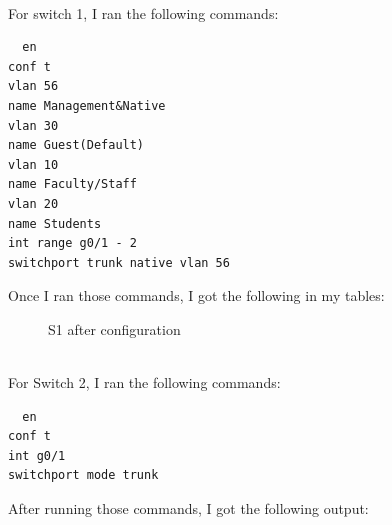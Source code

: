 \documentclass[../EngineeringJournal_CDavis.tex]{subfiles}
\begin{document}

\\
For switch 1, I ran the following commands:

\begin{verbatim}
  en
conf t
vlan 56
name Management&Native
vlan 30
name Guest(Default)
vlan 10
name Faculty/Staff
vlan 20
name Students
int range g0/1 - 2
switchport trunk native vlan 56
\end{verbatim}

Once I ran those commands, I got the following in my tables:


\begin{figure}[!hbt]\centering
{}\hfill
{}\par 
\caption{S1 after configuration}
\label{Show12S1}
\end{figure}


\noindent{}\\
For Switch 2, I ran the following commands:

\begin{verbatim}
  en
conf t
int g0/1
switchport mode trunk
\end{verbatim}

After running those commands, I got the following output:
\end{document}
